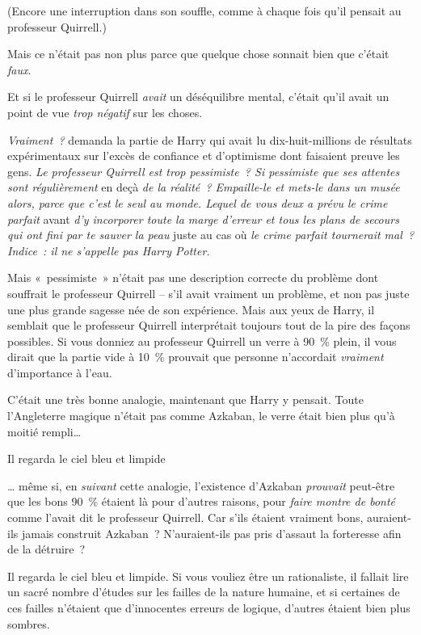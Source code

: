 (Encore une interruption dans son souffle, comme à chaque fois qu'il pensait au professeur Quirrell.)

Mais ce n'était pas non plus parce que quelque chose sonnait bien que c'était \emph{faux}.

Et si le professeur Quirrell \emph{avait} un déséquilibre mental, c'était qu'il avait un point de vue \emph{trop négatif} sur les choses.

\emph{Vraiment~?} demanda la partie de Harry qui avait lu dix-huit-millions de résultats expérimentaux sur l'excès de confiance et d'optimisme dont faisaient preuve les gens. \emph{Le professeur Quirrell est trop pessimiste~? Si pessimiste que ses attentes sont régulièrement} en deçà \emph{de la réalité~? Empaille-le et mets-le dans un musée alors, parce que c'est le seul au monde. Lequel de vous deux a prévu le crime parfait} avant \emph{d'y incorporer toute la marge d'erreur et tous les plans de secours qui ont fini par te sauver la peau} juste au cas où \emph{le crime parfait tournerait mal~? Indice~: il ne s'appelle pas Harry Potter.}

Mais «~pessimiste~» n'était pas une description correcte du problème dont souffrait le professeur Quirrell -- s'il avait vraiment un problème, et non pas juste une plus grande sagesse née de son expérience. Mais aux yeux de Harry, il semblait que le professeur Quirrell interprétait toujours tout de la pire des façons possibles. Si vous donniez au professeur Quirrell un verre à 90~\% plein, il vous dirait que la partie vide à 10~\% prouvait que personne n'accordait \emph{vraiment} d'importance à l'eau.

C'était une très bonne analogie, maintenant que Harry y pensait. Toute l'Angleterre magique n'était pas comme Azkaban, le verre était bien plus qu'à moitié rempli…

Il regarda le ciel bleu et limpide

… même si, en \emph{suivant} cette analogie, l'existence d'Azkaban \emph{prouvait} peut-être que les bons 90~\% étaient là pour d'autres raisons, pour \emph{faire montre de bonté} comme l'avait dit le professeur Quirrell. Car s'ils étaient vraiment bons, auraient-ils jamais construit Azkaban~? N'auraient-ils pas pris d'assaut la forteresse afin de la détruire~?

Il regarda le ciel bleu et limpide. Si vous vouliez être un rationaliste, il fallait lire un sacré nombre d'études sur les failles de la nature humaine, et si certaines de ces failles n'étaient que d'innocentes erreurs de logique, d'autres étaient bien plus sombres.

